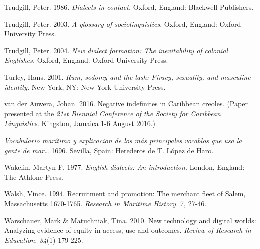 \begin{styleStandard}
Trudgill, Peter. 1986. \textit{Dialects in contact.} Oxford, England: Blackwell Publishers.
\end{styleStandard}


\begin{styleStandard}
Trudgill, Peter. 2003. \textit{A glossary of sociolinguistics}. Oxford, England: Oxford University Press.
\end{styleStandard}


\begin{styleStandard}
Trudgill, Peter. 2004. \textit{New dialect formation: The inevitability of colonial Englishes.} Oxford, England: Oxford University Press.
\end{styleStandard}


\begin{styleStandard}
Turley, Hans. 2001. \textit{Rum, sodomy and the lash: Piracy, sexuality, and masculine identity}. New York, NY: New York University Press. 
\end{styleStandard}


\begin{styleStandard}
van der Auwera, Johan. 2016. Negative indefinites in Caribbean creoles\textit{. }(Paper presented at the \textit{21st Biennial Conference of the Society for Caribbean Linguistics}. Kingston, Jamaica 1-6 August 2016.) 
\end{styleStandard}


\begin{styleStandard}
\textit{Vocabulario marítimo y explicacion de los más principales vocablos que usa la gente de mar…} 1696. Sevilla, Spain: Herederos de T. López de Haro. 
\end{styleStandard}


\begin{styleStandard}
Wakelin, Martyn F. 1977. \textit{English dialects: An introduction.} London, England: The Athlone Press.
\end{styleStandard}


\begin{styleStandard}
Walsh, Vince. 1994. Recruitment and promotion: The merchant fleet of Salem, Massachusetts 1670-1765. \textit{Research in Maritime History. }7, 27-46. 
\end{styleStandard}


\begin{styleStandard}
Warschauer, Mark \& Matuchniak, Tina. 2010. New technology and digital worlds: Analyzing evidence of equity in access, use and outcomes. \textit{Review of Research in Education. 34}(1) 179-225. \ 
\end{styleStandard}


